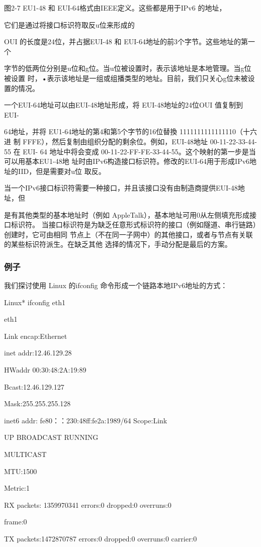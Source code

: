 图2-7 EU1-48 和 EUI-64格式由IEEE定义。这些都是用于IPv6 的地址，

它们是通过将接口标识符取反u位来形成的

OUI 的长度是24位，并占据EUI-48 和 EUI-64地址的前3个字节。这些地址的第一个

字节的低两位分别是u位和g位。当u位被设置时，表示该地址是本地管理。当g位被设置
时，•表示该地址是一组或组播类型的地址。目前，我们只关心g位未被设置的情况。

一个EUI-64地址可以由EUI-48地址形成，将 EUI-48地址的24位OUI 值复制到 EUI-

64地址，并将 EU1-64地址的第4和第5个字节的16位替換 1111111111111110（十六进
制 FFFE），然后复制由组织分配的剩余位。例如，EUI-48地址 00-11-22-33-44-55 在 EUI-
64 地址中将会变成 00-11-22-FF-FE-33-44-55。这个映射的第一步是当可以用基本EU1-48地
址时由IPv6构造接口标识符。修改的EUI-64用于形成IPv6地址的IID，但是需要对u位
取反。

当一个IPv6接口标识符需要一种接口，并且该接口没有由制造商提供EUI-48地址，但

是有其他类型的基本地址时（例如 AppleTalk），基本地址可用0从左侧填充形成接口标识符。
当接口标识符是为缺乏任意形式标识符的接口（例如隧道、串行链路）创建时，它可由相同
节点上（不在同一子网中）的其他接口，或者与节点有关联的某些标识符派生。在缺乏其他
选择的情况下，手动分配是最后的方案。

\subsubsection{例子}
我们探讨使用 Linux 的ifconfig 命令形成一个链路本地IPv6地址的方式：

Linux* ifconfig eth1

eth1

Link encap:Ethernet

inet addr:12.46.129.28

HWaddr 00:30:48:2A:19:89

Bcast:12.46.129.127

Mask:255.255.255.128

inet6 addr: fe80：：230:48ff:fe2a:1989/64 Scope:Link

UP BROADCAST RUNNING

MULTICAST

MTU:1500

Metric:1

RX packets: 1359970341 errors:0 dropped:0 overruns:0

frame:0

TX packets:1472870787 errors:0 dropped:0 overruns:0 carrier:0

